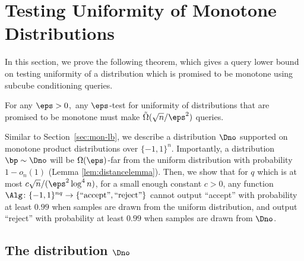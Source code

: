 
\section{Testing Uniformity of Monotone Distributions}

In this section, we prove the following theorem, which gives a query lower bound on testing uniformity of a distribution which is promised to be monotone using subcube conditioning queries. 
\begin{theorem} For any $\eps > 0$,~any $\eps$-test for uniformity of distributions that are promised to be monotone must make $\tilde{\Omega}(\sqrt{n}/\eps^2)$ queries.
\end{theorem}
Similar to Section~\ref{sec:mon-lb}, we describe a distribution $\Dno$ supported on monotone product distributions over $\{-1,1\}^n$. Importantly, a distribution $\bp \sim \Dno$ will be $\Omega(\eps)$-far from the uniform distribution with probability $1-o_n(1)$ (Lemma \ref{lem:distancelemma}). Then, we show that for  $q$ which is at most $c \sqrt{n} / (\eps^2 \log^4 n)$, for a small enough constant $c > 0$, any function $\Alg \colon \{-1,1\}^{nq} \to \{\text{``accept''}, \text{``reject''} \}$ cannot output ``accept'' with probability at least $0.99$ when samples are drawn from the uniform distribution, and output ``reject'' with probability at least $0.99$ when samples are drawn from  $\Dno$.

\subsection{The distribution $\Dno$}\label{sec:dno-def}

